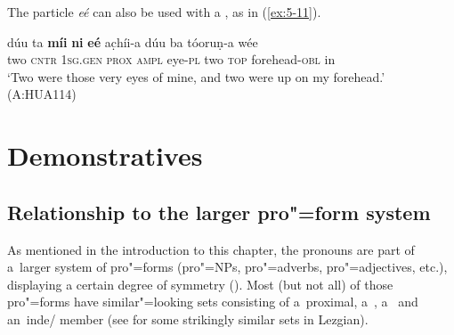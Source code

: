 The particle \textit{eé} can also be used with  a , as in (\ref{ex:5-11}). 


\begin{exe}
\ex
\label{ex:5-11}
\gll dúu ta \textbf{míi} \textbf{ni} \textbf{eé} ac̣híi-a dúu ba tóoruṇ-a wée \\
	two \textsc{cntr} \textsc{1sg.gen} \textsc{prox} \textsc{ampl} eye-\textsc{pl} two \textsc{top} forehead-\textsc{obl} in \\
\glt `Two were those very eyes of mine, and two were up on my forehead.' (A:HUA114) 
\end{exe}

\section{Demonstratives}
\label{sec:5-3}

\subsection{Relationship to the larger pro"=form system}
\label{subsec:5-2-1}


As mentioned in the introduction to this chapter, the  pronouns are part of a~larger system of pro"=forms (pro"=NPs, pro"=adverbs, pro"=adjectives, etc.), displaying a certain degree of symmetry (). Most (but not all) of those pro"=forms have similar"=looking sets consisting of a~proximal, a~, a~ and an~inde/ member (see \citealt[187--188]{haspelmath1993} for some strikingly similar sets in Lezgian).



